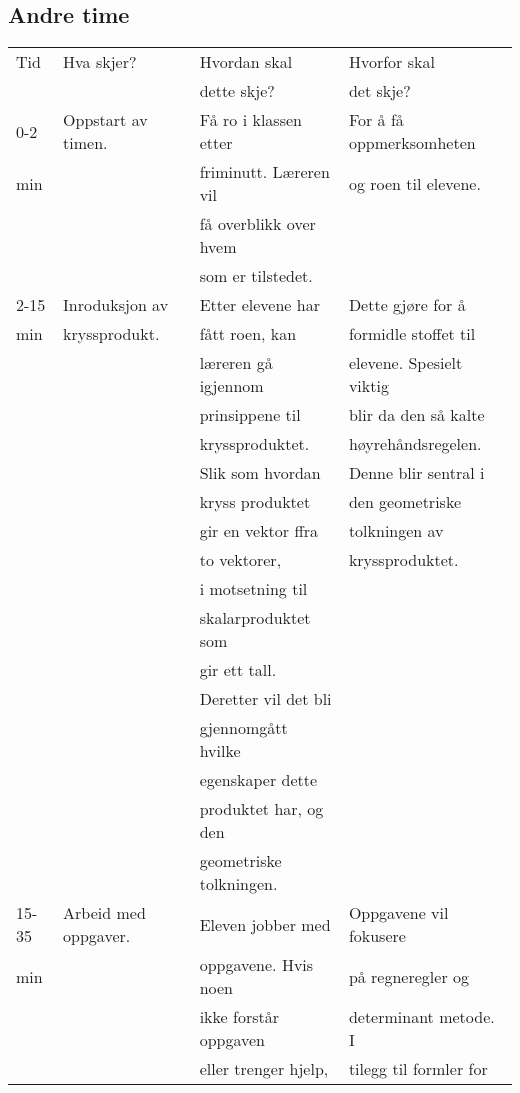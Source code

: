 \documentclass{article}
\begin{document}
\subsection*{Andre time}
\label{sec-2-2}
\begin{center}
\begin{tabular}{l|l|l|l}
Tid & Hva skjer? & Hvordan skal & Hvorfor skal\\
 &  & dette skje? & det skje?\\
\hline
0-2 & Oppstart av timen. & Få ro i klassen etter & For å få oppmerksomheten\\
min &  & friminutt. Læreren vil & og roen til elevene.\\
 &  & få overblikk over hvem & \\
 &  & som er tilstedet. & \\
\hline
2-15 & Inroduksjon av & Etter elevene har & Dette gjøre for å\\
min & kryssprodukt. & fått roen, kan & formidle stoffet til\\
 &  & læreren gå igjennom & elevene. Spesielt viktig\\
 &  & prinsippene til & blir da den så kalte\\
 &  & kryssproduktet. & høyrehåndsregelen.\\
 &  & Slik som hvordan & Denne blir sentral i\\
 &  & kryss produktet & den geometriske\\
 &  & gir en vektor ffra & tolkningen av\\
 &  & to vektorer, & kryssproduktet.\\
 &  & i motsetning til & \\
 &  & skalarproduktet som & \\
 &  & gir ett tall. & \\
 &  & Deretter vil det bli & \\
 &  & gjennomgått hvilke & \\
 &  & egenskaper dette & \\
 &  & produktet har, og den & \\
 &  & geometriske tolkningen. & \\
\hline
15-35 & Arbeid med oppgaver. & Eleven jobber med & Oppgavene vil fokusere\\
min &  & oppgavene. Hvis noen & på regneregler og\\
 &  & ikke forstår oppgaven & determinant metode. I\\
 &  & eller trenger hjelp, & tilegg til formler for\\

\end{tabular}
\end{center}
\end{document}
